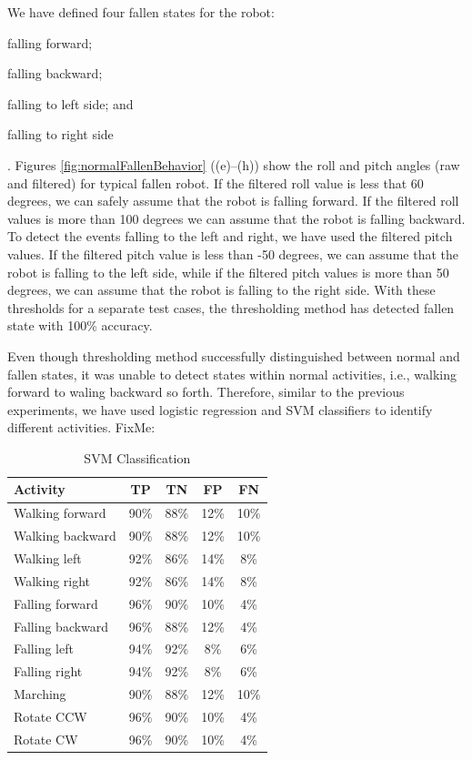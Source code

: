 \documentclass[letterpaper]{article}
\begin{document}
We have defined four fallen states for the robot: \begin{inparaenum}[(1)] \item falling
forward; \item falling backward; \item falling to left side; and \item falling to right
side\end{inparaenum}. Figures \ref{fig:normalFallenBehavior} ((e)--(h)) show the roll and pitch 
angles (raw and filtered) for typical fallen robot. If the filtered roll value is less that 60 
degrees, we can safely assume that the robot is falling forward. If the filtered roll values is 
more than 100 degrees we can assume that the robot is falling backward. To detect the events 
falling to the left and right, we have used the filtered pitch values. If the filtered pitch value 
is less than -50 degrees, we can assume that the robot is falling to the left side, while if the 
filtered pitch values is more than 50 degrees, we can assume that the robot is falling to the right 
side. With these thresholds for a separate test cases, the thresholding method has detected fallen 
state with 100\% accuracy. 


Even though thresholding method successfully distinguished between normal and fallen states, it was 
unable to detect states within normal activities, i.e., walking forward to waling backward so 
forth. Therefore, similar to the previous experiments, we have used logistic regression and SVM 
classifiers to identify different activities. FixMe:


\begin{table}[!ht]
\caption{SVM Classification}
	\label{tab:robot-svm-class}
	\centering
		\begin{tabular} {| l | c | c | c | c | }
		\hline
			{\bf Activity} & {\bf  TP}  &	{\bf TN}  &	{\bf FP} &	{\bf FN} \\ 
\hline
			Walking forward	& 90\%	& 88\%	& 12\%	& 10\% \\ \hline
			Walking backward	& 90\%	& 88\%	& 12\%	& 10\% \\ \hline
			Walking left	& 92\%	& 86\%	& 14\%	& 8\% \\ \hline
			Walking right	& 92\%	& 86\%	& 14\%	& 8\% \\ \hline
			Falling forward	& 96\%	& 90\%	& 10\%	& 4\%	 \\ \hline
			Falling backward	& 96\%	& 88\%	& 12\%	& 4\%	 \\ \hline
			Falling left	& 94\%	& 92\%	& 8\%	& 6\%	 \\ \hline
			Falling right	& 94\%	& 92\%	& 8\%	& 6\%	 \\ \hline
			Marching	& 90\%	& 88\%	& 12\%	& 10\%	 \\ \hline
			Rotate CCW	& 96\%	& 90\%	& 10\%	& 4\%	 \\ \hline
			Rotate CW	& 96\%	& 90\%	& 10\%	& 4\%	 \\ \hline
		\end{tabular}
\end{table}
\end{document}
